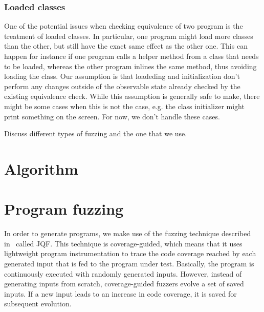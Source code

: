 \documentclass[runningheads,a4paper]{llncs}
\begin{document}







\subsubsection{Loaded classes}

One of the potential issues when checking equivalence of two program
is the treatment of loaded classes. In particular, one program might
load more classes than the other, but still have the exact same effect
as the other one. This can happen for instance if one program calls a
helper method from a class that needs to be loaded, whereas the other
program inlines the same method, thus avoiding loading the class.  Our
assumption is that loadeding and initialization don't perform any
changes outside of the observable state already checked by the
existing equivalence check.  While this assumption is generally safe
to make, there might be some cases when this is not the case, e.g. the
class initializer might print something on the screen. For now, we
don't handle these cases.





Discuss different types of fuzzing and the one that we use.

\section{Algorithm}


\section{Program fuzzing}

In order to generate programs, we make use of the fuzzing technique described
in~\cite{DBLP:conf/issta/PadhyeLS19} called JQF.  This technique is
coverage-guided, which means that it uses lightweight program
instrumentation to trace the code coverage reached by each generated
input that is fed to the program under test.  Basically, the program
is continuously executed with randomly generated inputs. However,
instead of generating inputs from scratch, coverage-guided fuzzers
evolve a set of saved inputs. If a new input leads to an increase
in code coverage, it is saved for subsequent evolution.
\end{document}
